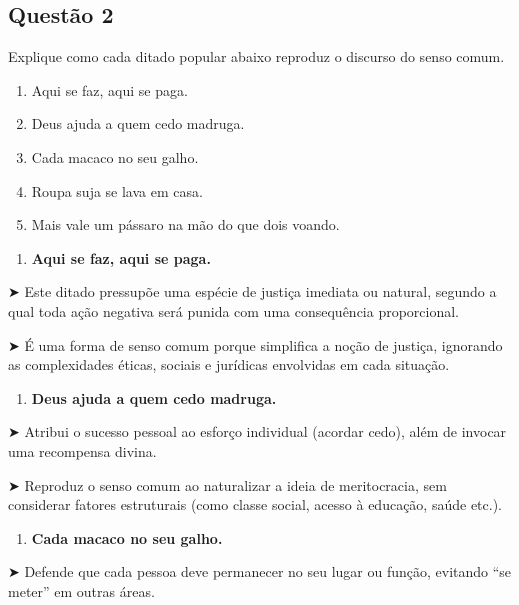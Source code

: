 \documentclass[
]{book}
\providecommand{\tightlist}{%
  \setlength{\itemsep}{0pt}\setlength{\parskip}{0pt}}
\begin{document}
\subsection{Questão 2}\label{questuxe3o-2-2}

Explique como cada ditado popular abaixo reproduz o discurso do senso comum.

\begin{enumerate}
\def\labelenumi{\arabic{enumi}.}
\item
  Aqui se faz, aqui se paga.
\item
  Deus ajuda a quem cedo madruga.
\item
  Cada macaco no seu galho.
\item
  Roupa suja se lava em casa.
\item
  Mais vale um pássaro na mão do que dois voando.
\end{enumerate}

\begin{enumerate}
\def\labelenumi{\arabic{enumi}.}
\tightlist
\item
  \textbf{Aqui se faz, aqui se paga.}
\end{enumerate}

➤ Este ditado pressupõe uma espécie de justiça imediata ou natural, segundo a qual toda ação negativa será punida com uma consequência proporcional.

➤ É uma forma de senso comum porque simplifica a noção de justiça, ignorando as complexidades éticas, sociais e jurídicas envolvidas em cada situação.

\begin{enumerate}
\def\labelenumi{\arabic{enumi}.}
\setcounter{enumi}{1}
\tightlist
\item
  \textbf{Deus ajuda a quem cedo madruga.}
\end{enumerate}

➤ Atribui o sucesso pessoal ao esforço individual (acordar cedo), além de invocar uma recompensa divina.

➤ Reproduz o senso comum ao naturalizar a ideia de meritocracia, sem considerar fatores estruturais (como classe social, acesso à educação, saúde etc.).

\begin{enumerate}
\def\labelenumi{\arabic{enumi}.}
\setcounter{enumi}{2}
\tightlist
\item
  \textbf{Cada macaco no seu galho.}
\end{enumerate}

➤ Defende que cada pessoa deve permanecer no seu lugar ou função, evitando ``se meter'' em outras áreas.
\end{document}
